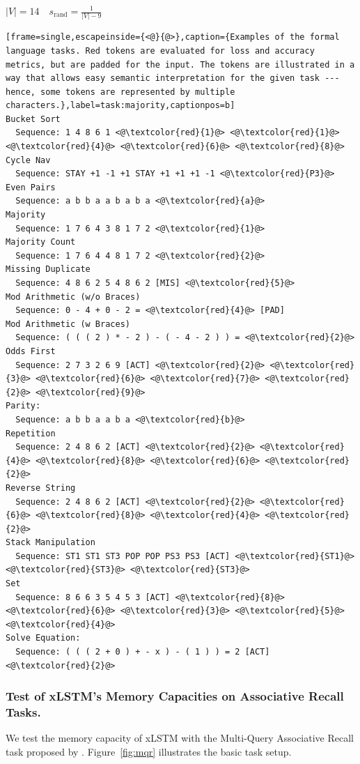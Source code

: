 \documentclass[dvipsnames]{article}
\begin{document}
\begin{appendix}
\begin{itemize}
    $|V|=14 \quad s_{\text{rand}}=\frac{1}{|V|-9}$
\end{itemize}
\clearpage
\begin{lstlisting}[frame=single,escapeinside={<@}{@>},caption={Examples of the formal language tasks. Red tokens are evaluated for loss and accuracy metrics, but are padded for the input. The tokens are illustrated in a way that allows easy semantic interpretation for the given task --- hence, some tokens are represented by multiple characters.},label=task:majority,captionpos=b]
Bucket Sort
  Sequence: 1 4 8 6 1 <@\textcolor{red}{1}@> <@\textcolor{red}{1}@> <@\textcolor{red}{4}@> <@\textcolor{red}{6}@> <@\textcolor{red}{8}@>
Cycle Nav
  Sequence: STAY +1 -1 +1 STAY +1 +1 +1 -1 <@\textcolor{red}{P3}@>
Even Pairs
  Sequence: a b b a a b a b a <@\textcolor{red}{a}@>
Majority
  Sequence: 1 7 6 4 3 8 1 7 2 <@\textcolor{red}{1}@>
Majority Count
  Sequence: 1 7 6 4 4 8 1 7 2 <@\textcolor{red}{2}@>
Missing Duplicate
  Sequence: 4 8 6 2 5 4 8 6 2 [MIS] <@\textcolor{red}{5}@>
Mod Arithmetic (w/o Braces)
  Sequence: 0 - 4 + 0 - 2 = <@\textcolor{red}{4}@> [PAD]
Mod Arithmetic (w Braces)
  Sequence: ( ( ( 2 ) * - 2 ) - ( - 4 - 2 ) ) = <@\textcolor{red}{2}@>
Odds First
  Sequence: 2 7 3 2 6 9 [ACT] <@\textcolor{red}{2}@> <@\textcolor{red}{3}@> <@\textcolor{red}{6}@> <@\textcolor{red}{7}@> <@\textcolor{red}{2}@> <@\textcolor{red}{9}@>
Parity:
  Sequence: a b b a a b a <@\textcolor{red}{b}@>
Repetition
  Sequence: 2 4 8 6 2 [ACT] <@\textcolor{red}{2}@> <@\textcolor{red}{4}@> <@\textcolor{red}{8}@> <@\textcolor{red}{6}@> <@\textcolor{red}{2}@>
Reverse String
  Sequence: 2 4 8 6 2 [ACT] <@\textcolor{red}{2}@> <@\textcolor{red}{6}@> <@\textcolor{red}{8}@> <@\textcolor{red}{4}@> <@\textcolor{red}{2}@>
Stack Manipulation
  Sequence: ST1 ST1 ST3 POP POP PS3 PS3 [ACT] <@\textcolor{red}{ST1}@> <@\textcolor{red}{ST3}@> <@\textcolor{red}{ST3}@>
Set
  Sequence: 8 6 6 3 5 4 5 3 [ACT] <@\textcolor{red}{8}@> <@\textcolor{red}{6}@> <@\textcolor{red}{3}@> <@\textcolor{red}{5}@> <@\textcolor{red}{4}@>
Solve Equation:
  Sequence: ( ( ( 2 + 0 ) + - x ) - ( 1 ) ) = 2 [ACT] <@\textcolor{red}{2}@>
\end{lstlisting}
\subsubsection{Test of xLSTM's Memory Capacities on Associative Recall Tasks.}\label{sec:appExpSynthetic-mqar}
We test the memory capacity of xLSTM with the Multi-Query Associative Recall task proposed by \citet{Arora:23arxiv}.
Figure~\ref{fig:mqr} illustrates the basic task setup.

\end{appendix}
\end{document}
